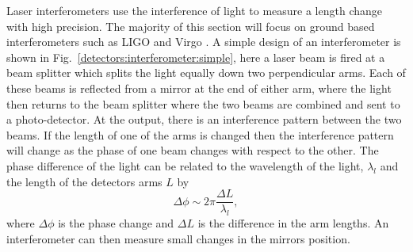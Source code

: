 Laser interferometers use the interference of light to measure a
length change with high precision.  The majority of this
section will focus on ground based interferometers such as \gls{LIGO} and Virgo
\citep{aasi2015AdvancedLIGO,acernese2015AdvancedVirgo}.  A simple design of an
interferometer is shown in Fig.~\ref{detectors:interferometer:simple}, here a laser
beam is fired at a beam splitter which splits the light equally down two
perpendicular arms.  Each of these beams is reflected from a mirror at the end
of either arm, where the light then returns to the beam splitter where the two beams
are combined and sent to a photo-detector.  At the output, there is an
interference pattern between the two beams.  If the length of one of the arms
is changed then the interference pattern will change as the phase of one beam
changes with respect to the other.  The phase difference of the light can be
related to the wavelength of the light, $\lambda_l$ and the length of the
detectors arms $L$ by
%
\begin{equation}
\label{intro:detectors:phasechange}
\Delta \phi \sim 2 \pi \frac{\Delta L}{\lambda_l},
\end{equation}
%
where $\Delta
\phi$ is the phase change and $\Delta L$ is the difference in the arm lengths.
An interferometer can then measure small changes in the mirrors position.


